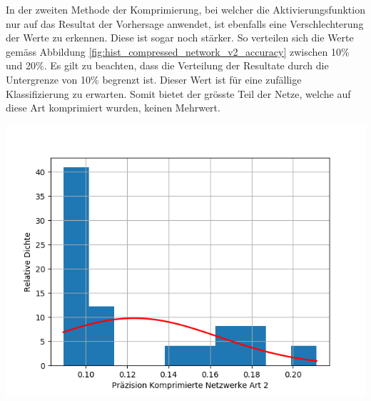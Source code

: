 \documentclass[Interploate_hadwritten_Digits.tex]{subfiles}
\begin{document}
	In der zweiten Methode der Komprimierung, bei welcher die Aktivierungsfunktion nur auf das Resultat der Vorhersage anwendet, ist ebenfalls eine Verschlechterung der Werte zu erkennen. Diese ist sogar noch stärker. So verteilen sich die Werte gemäss Abbildung \ref{fig:hist_compressed_network_v2_accuracy} zwischen 10\% und 20\%. Es gilt zu beachten, dass die Verteilung der Resultate durch die Untergrenze von 10\% begrenzt ist. Dieser Wert ist für eine zufällige Klassifizierung zu erwarten. Somit bietet der grösste Teil der Netze, welche auf diese Art komprimiert wurden, keinen Mehrwert.
	\begin{Figure}
		\centering
		\includegraphics[width=\linewidth]{img/results/histogram_compressed_network_v2_accuracy.png}
		\label{fig:hist_compressed_network_v2_accuracy}
	\end{Figure}
\end{document}
